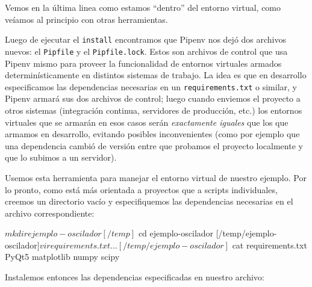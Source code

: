 Vemos en la última linea como estamos ``dentro'' del entorno virtual, como veíamos al principio con otras herramientas.

Luego de ejecutar el \texttt{install} encontramos que Pipenv nos dejó dos archivos nuevos: el \texttt{Pipfile} y el \texttt{Pipfile.lock}. Estos son archivos de control que usa Pipenv mismo para proveer la funcionalidad de entornos virtuales armados determinísticamente en distintos sistemas de trabajo. La idea es que en desarrollo especificamos las dependencias necesarias en un \texttt{requirements.txt} o similar, y Pipenv armará sus dos archivos de control; luego cuando enviemos el proyecto a otros sistemas (integración continua, servidores de producción, etc.) los entornos virtuales que se armarán en esos casos serán \textit{exactamente iguales} que los que armamos en desarrollo, evitando posibles inconvenientes (como por ejemplo que una dependencia cambió de versión entre que probamos el proyecto localmente y que lo subimos a un servidor).

Usemos esta herramienta para manejar el entorno virtual de nuestro ejemplo. Por lo pronto, como está más orientada a proyectos que a scripts individuales, creemos un directorio vacío y especifiquemos las dependencias necesarias en el archivo correspondiente:

\begin{shell}
[/temp]$ mkdir ejemplo-oscilador
[/temp]$ cd ejemplo-oscilador
[/temp/ejemplo-oscilador]$ vi requirements.txt
...
[/temp/ejemplo-oscilador]$ cat requirements.txt 
PyQt5
matplotlib
numpy
scipy
\end{shell}

Instalemos entonces las dependencias especificadas en nuestro archivo:


